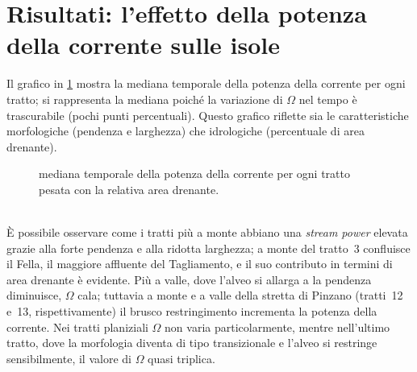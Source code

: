 \section{Risultati: l'effetto della potenza della corrente sulle isole}
Il grafico in \cref{graph:omega-perc-50} mostra la mediana temporale della potenza della corrente per ogni tratto; si rappresenta la mediana poiché la variazione di $\Omega$ nel tempo è trascurabile (pochi punti percentuali).
Questo grafico riflette sia le caratteristiche morfologiche (pendenza e larghezza) che idrologiche (percentuale di area drenante).
%
\begin{figure}
	\centering
	
	\caption[potenza della corrente in ogni tratto]{mediana temporale della potenza della corrente per ogni tratto pesata con la relativa area drenante.}
	\label{graph:omega-perc-50}
\end{figure}
%
\\
È possibile osservare come i tratti più a monte abbiano una \emph{stream power} elevata grazie alla forte pendenza e alla ridotta larghezza; a monte del tratto~3 confluisce il Fella, il maggiore affluente del Tagliamento, e il suo contributo in termini di area drenante è evidente.
Più a valle, dove l'alveo si allarga a la pendenza diminuisce, $\Omega$ cala; tuttavia a monte e a valle della stretta di Pinzano (tratti~12 e~13, rispettivamente) il brusco restringimento incrementa la potenza della corrente.
Nei tratti planiziali $\Omega$ non varia particolarmente, mentre nell'ultimo tratto, dove la morfologia diventa di tipo transizionale e l'alveo si restringe sensibilmente, il valore di $\Omega$ quasi triplica.


